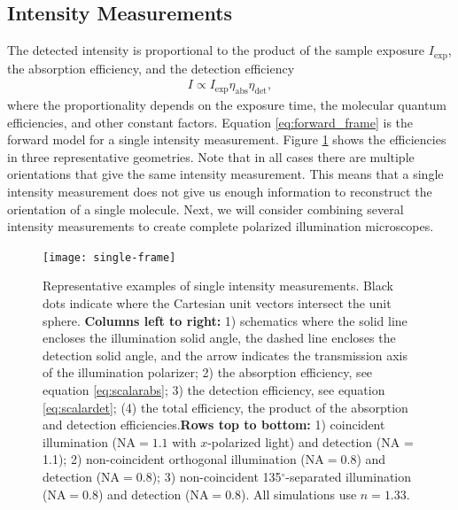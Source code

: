 \documentclass[10pt]{article}
\begin{document}
\subsection{Intensity Measurements}\label{forward}
The detected intensity is proportional to the product of the sample exposure
$I_{\text{exp}}$, the absorption efficiency, and the detection efficiency
\begin{align}
  I \propto I_{\text{exp}}\eta_{\text{abs}}\eta_{\text{det}}\label{eq:forward_frame},
\end{align}
where the proportionality depends on the exposure time, the molecular quantum
efficiencies, and other constant factors. Equation \ref{eq:forward_frame} is the
forward model for a single intensity measurement. Figure
\ref{fig:single-frame} shows the efficiencies in three representative
geometries. Note that in all cases there are multiple orientations that give the
same intensity measurement. This means that a single intensity measurement does
not give us enough information to reconstruct the orientation of a single
molecule. Next, we will consider combining several intensity measurements to
create complete polarized illumination microscopes.

\begin{figure}[H]
\centering\texttt{[image: single-frame]}
\caption{Representative examples of single intensity measurements. Black dots
  indicate where the Cartesian unit vectors intersect the unit sphere. \newline \newline \textbf{Columns left to right:} 1) schematics where
  the solid line encloses the illumination solid angle, the dashed line encloses
  the detection solid angle, and the arrow indicates the transmission axis of
  the illumination polarizer; 2) the absorption efficiency, see equation
  \ref{eq:scalarabs}; 3) the detection efficiency, see equation
  \ref{eq:scalardet}; (4) the total efficiency, the product of the absorption
  and detection efficiencies.\newline \newline \textbf{Rows top to bottom:} 1)
  coincident illumination ($\text{NA} = 1.1$ with $x$-polarized light) and
  detection (NA = 1.1); 2) non-coincident orthogonal illumination
  ($\text{NA} = 0.8$) and detection ($\text{NA} = 0.8$); 3) non-coincident
  135${}^{\circ}$-separated illumination ($\text{NA} = 0.8$) and detection
  ($\text{NA} = 0.8$). All simulations use $n=1.33$.}
  \label{fig:single-frame}
\end{figure}
\end{document}

